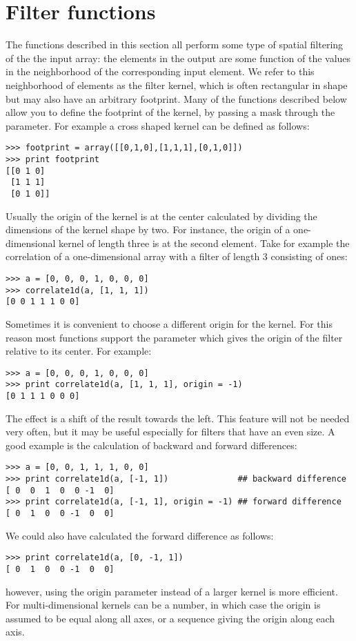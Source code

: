 \section{Filter functions}
\label{sec:ndimage:filter-functions}
The functions described in this section all perform some type of spatial
filtering of the the input array: the elements in the output are some 
function of the values in the neighborhood of the corresponding input 
element. We refer to this neighborhood of elements as the filter kernel, 
which is often rectangular in shape but may also have an arbitrary 
footprint. Many of the functions described below allow you to define the 
footprint of the kernel, by passing a mask through the  
parameter. For example a cross shaped kernel can be defined as follows:
\begin{verbatim}
>>> footprint = array([[0,1,0],[1,1,1],[0,1,0]])
>>> print footprint
[[0 1 0]
 [1 1 1]
 [0 1 0]]
\end{verbatim}
Usually the origin of the kernel is at the center calculated by dividing 
the dimensions of the kernel shape by two.  For instance, the origin of a
one-dimensional kernel of length three is at the second element. Take for
example the correlation of a one-dimensional array with a filter of
length 3 consisting of ones:
\begin{verbatim}
>>> a = [0, 0, 0, 1, 0, 0, 0]
>>> correlate1d(a, [1, 1, 1])
[0 0 1 1 1 0 0]
\end{verbatim}
Sometimes it is convenient to choose a different origin for the kernel. For
this reason most functions support the  parameter which gives 
the origin of the filter relative to its center. For example:
\begin{verbatim}
>>> a = [0, 0, 0, 1, 0, 0, 0]
>>> print correlate1d(a, [1, 1, 1], origin = -1)
[0 1 1 1 0 0 0]
\end{verbatim}
The effect is a shift of the result towards the left. This feature will not 
be needed very often, but it may be useful especially for filters that have 
an even size.  A good example is the calculation of backward and forward
differences:
\begin{verbatim}
>>> a = [0, 0, 1, 1, 1, 0, 0]
>>> print correlate1d(a, [-1, 1])              ## backward difference
[ 0  0  1  0  0 -1  0]
>>> print correlate1d(a, [-1, 1], origin = -1) ## forward difference
[ 0  1  0  0 -1  0  0]
\end{verbatim}
We could also have calculated the  forward difference as follows:
\begin{verbatim}
>>> print correlate1d(a, [0, -1, 1])
[ 0  1  0  0 -1  0  0]
\end{verbatim}
however, using the origin parameter instead of a larger kernel is more
efficient. For multi-dimensional kernels  can be a number, in 
which case the origin is assumed to be equal along all axes, or a sequence  
giving the origin along each axis.

